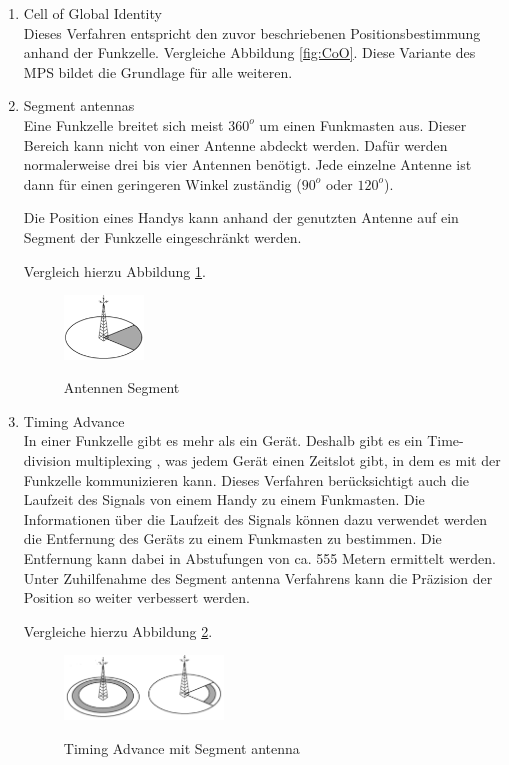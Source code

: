 \begin{enumerate}
\item Cell of Global Identity \\
Dieses Verfahren entspricht den zuvor beschriebenen Positionsbestimmung anhand der Funkzelle. Vergleiche Abbildung \ref{fig:CoO}. Diese Variante des MPS bildet die Grundlage für alle weiteren.
\item Segment antennas \\
Eine Funkzelle breitet sich meist $360^{o}$ um einen Funkmasten aus. Dieser Bereich kann nicht von einer Antenne abdeckt werden. Dafür werden normalerweise drei bis vier Antennen benötigt. Jede einzelne Antenne ist dann für einen geringeren Winkel zuständig ($90^{o}$ oder $120^{o}$).

Die Position eines Handys kann anhand der genutzten Antenne auf ein Segment der Funkzelle eingeschränkt werden.
\cite[S. 208]{Schiller2004}

Vergleich hierzu Abbildung \ref{fig:SA}.

\begin{figure}[h]
\centering
\includegraphics[width=0.2\textwidth]{ref/images/SegmentAntennas.PNG}
\caption[Antennen Segment]{Antennen Segment}
\label{fig:SA}
\cite[S. 209]{Schiller2004}
\end{figure}

\item Timing Advance \\
In einer Funkzelle gibt es mehr als ein Gerät. Deshalb gibt es ein \glqq Time-division multiplexing \grqq , was jedem Gerät einen Zeitslot gibt, in dem es mit der Funkzelle kommunizieren kann. Dieses Verfahren berücksichtigt auch die Laufzeit des Signals von einem Handy zu einem Funkmasten. Die Informationen über die Laufzeit des Signals können dazu verwendet werden die Entfernung des Geräts zu einem Funkmasten zu bestimmen. Die Entfernung kann dabei in Abstufungen von ca. 555 Metern ermittelt werden. Unter Zuhilfenahme des Segment antenna Verfahrens kann die Präzision der Position so weiter verbessert werden.
\cite[S. 208]{Schiller2004}

Vergleiche hierzu Abbildung \ref{fig:TA}.

\begin{figure}[h]
\centering
\includegraphics[width=0.4\textwidth]{ref/images/TimingAdvance.PNG}
\caption[Timing Advance mit Segment antenna]{Timing Advance mit Segment antenna}
\label{fig:TA}
\cite[S. 209]{Schiller2004}
\end{figure}


\end{enumerate}
